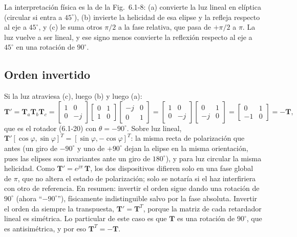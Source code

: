 \documentclass{article}
\newcommand{\Tm}{\mathbf{T}}
\begin{document}
La interpretación física es la de la Fig.~6.1-8: (a) convierte la luz lineal en elíptica
(circular si entra a $45^\circ$), (b) invierte la helicidad de esa elipse y la refleja respecto al
eje a $45^\circ$, y (c) le suma otros $\pi/2$ a la fase relativa, que pasa de $+\pi/2$ a $\pi$. La luz vuelve a ser
lineal, y ese signo menos convierte la reflexión respecto al eje a $45^\circ$ en una rotación de
$90^\circ$.

\subsection*{Orden invertido}

Si la luz atraviesa (c), luego (b) y luego (a):
\[
\Tm'=\Tm_a\Tm_b\Tm_c
=\begin{bmatrix}1&0\\0&-j\end{bmatrix}
\begin{bmatrix}0&1\\1&0\end{bmatrix}
\begin{bmatrix}-j&0\\0&1\end{bmatrix}
=\begin{bmatrix}1&0\\0&-j\end{bmatrix}
\begin{bmatrix}0&1\\-j&0\end{bmatrix}
=\begin{bmatrix}0&1\\-1&0\end{bmatrix}=-\Tm ,
\]
que es el rotador (6.1-20) con $\theta=-90^\circ$. Sobre luz lineal,
$\Tm'[\cos\varphi,\sin\varphi]^T=[\sin\varphi,-\cos\varphi]^T$: la misma recta de polarización
que antes (un giro de $-90^\circ$ y uno de $+90^\circ$ dejan la elipse en la misma orientación,
pues las elipses son invariantes ante un giro de $180^\circ$), y para luz circular la misma
helicidad. Como $\Tm'=e^{j\pi}\,\Tm$, los dos dispositivos difieren solo en una fase global de
$\pi$, que no altera el estado de polarización; solo se notaría si el haz interfiriera con otro
de referencia. En resumen: invertir el orden sigue dando una rotación de $90^\circ$ (ahora
``$-90^\circ$''), físicamente indistinguible salvo por la fase absoluta. Invertir el orden da siempre la
transpuesta, $\Tm'=\Tm^{T}$, porque la matriz de cada retardador lineal es simétrica. Lo particular
de este caso es que $\Tm$ es una rotación de $90^\circ$, que es antisimétrica, y por eso
$\Tm^T=-\Tm$.
\end{document}

